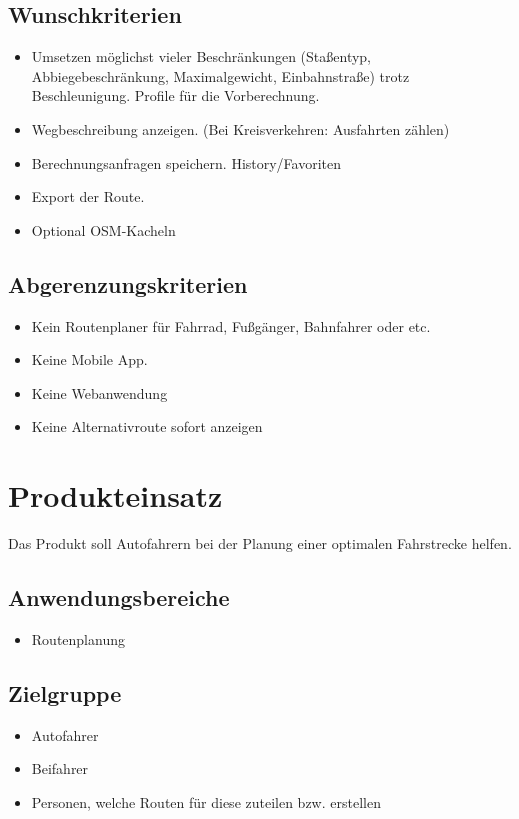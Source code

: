 \documentclass[a4paper, 11pt]{article}
\begin{document}
\subsection{Wunschkriterien}
\begin{itemize}
\item Umsetzen möglichst vieler Beschränkungen (Staßentyp, Abbiegebeschränkung, 
Maximalgewicht, Einbahnstraße) trotz Beschleunigung. Profile für die Vorberechnung. %

\item Wegbeschreibung anzeigen. (Bei Kreisverkehren: Ausfahrten zählen)
\item Berechnungsanfragen speichern. History/Favoriten
\item Export der Route.

\item Optional OSM-Kacheln

\end{itemize}
\subsection{Abgerenzungskriterien}

\begin{itemize}
\item Kein Routenplaner für Fahrrad, Fußgänger, Bahnfahrer oder etc.
\item Keine Mobile App.
\item Keine Webanwendung
\item Keine Alternativroute sofort anzeigen

\end{itemize}

\section{Produkteinsatz}

Das Produkt soll Autofahrern bei der Planung einer optimalen Fahrstrecke helfen.

\subsection{Anwendungsbereiche}
\begin{itemize}
\item Routenplanung
\end{itemize}

\subsection{Zielgruppe}
\begin{itemize}
\item Autofahrer
\item Beifahrer
\item Personen, welche Routen für diese zuteilen bzw. erstellen
\end{itemize}
\end{document}
